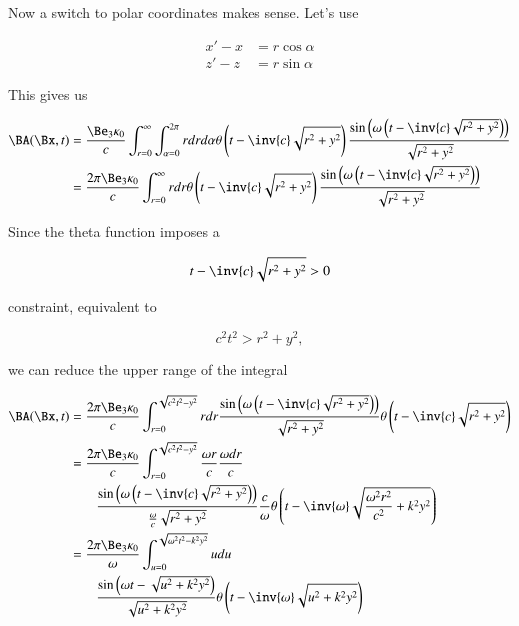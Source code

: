 Now a switch to polar coordinates makes sense.  Let's use

\begin{align}\label{eqn:relElectroDynProblemSet5P1:90}
x' - x &= r \cos\alpha \\
z' - z &= r \sin\alpha 
\end{align}

This gives us

\begin{align*}
\BA(\Bx, t) 
&= \frac{
\Be_3 \kappa_0
}{c} \int_{r=0}^\infty \int_{\alpha=0}^{2\pi} r dr d\alpha
\theta\left(t - \inv{c} \sqrt{r^2 + y^2}\right) 
\frac{\sin\left(\omega\left(t - \inv{c} \sqrt{r^2 + y^2 }\right)\right)}{\sqrt{r^2 + y^2}} \\
&= \frac{
2 \pi \Be_3 \kappa_0
}{c} \int_{r=0}^\infty r dr 
\theta\left(t - \inv{c} \sqrt{r^2 + y^2}\right) 
\frac{\sin\left(\omega\left(t - \inv{c} \sqrt{r^2 + y^2 }\right)\right)}{\sqrt{r^2 + y^2}} \\
\end{align*}

Since the theta function imposes a 

\begin{equation}\label{eqn:relElectroDynProblemSet5P1:110}
t - \inv{c} \sqrt{r^2 + y^2 } > 0
\end{equation}

constraint, equivalent to

\begin{equation}\label{eqn:relElectroDynProblemSet5P1:130}
c^2 t^2 > r^2 + y^2,
\end{equation}

we can reduce the upper range of the integral

\begin{align*}
\BA(\Bx, t) 
&= \frac{
2 \pi \Be_3 \kappa_0
}{c} 
\int_{r=0}^{\sqrt{c^2 t^2 - y^2}} r dr 
\frac{\sin\left(\omega\left(t - \inv{c} \sqrt{r^2 + y^2 }\right)\right)}{\sqrt{r^2 + y^2}}  
\theta\left(t - \inv{c} \sqrt{r^2 + y^2}\right) \\
&= \frac{
2 \pi \Be_3 \kappa_0
}{c} 
\int_{r=0}^{\sqrt{c^2 t^2 - y^2}} \frac{ \omega r}{c} \frac{\omega dr }{c} \\
&\qquad \frac{\sin\left(\omega\left(t - \inv{c} \sqrt{r^2 + y^2 }\right)\right)}{\frac{\omega}{c} \sqrt{r^2 + y^2}} \frac{c}{\omega} 
\theta\left(t - \inv{\omega} \sqrt{\frac{\omega^2 r^2}{c^2} + k^2 y^2}\right)  \\
&= 
\frac{ 2 \pi \Be_3 \kappa_0 }{\omega} 
\int_{u=0}^{\sqrt{\omega^2 t^2 - k^2 y^2}} u du  \\
&\qquad \frac{\sin\left( \omega t - \sqrt{u^2 + k^2 y^2 } \right)}{\sqrt{u^2 + k^2 y^2}} 
\theta\left(t - \inv{\omega} \sqrt{u^2 + k^2 y^2}\right)  \\
\end{align*}

